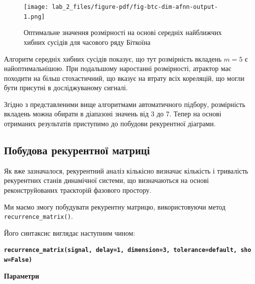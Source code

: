 \documentclass[
  letterpaper,
]{report}
\begin{document}
\begin{figure}[H]

{\centering \texttt{[image: lab\_2\_files/figure-pdf/fig-btc-dim-afnn-output-1.png]}

}

\caption{\label{fig-btc-dim-afnn}Оптимальне значення розмірності на
основі середніх найближчих хибних сусідів для часового ряду Біткоїна}

\end{figure}

Алгоритм середніх хибних сусідів показує, що тут розмірність вкладень
\(m=5\) є найоптимальнішою. При подальшому наростанні розмірності,
атрактор має походити на більш стохастичний, що вказує на втрату всіх
кореляцій, що могли бути присутні в досліджуваному сигналі.

Згідно з представленими вище алгоритмами автоматичного підбору,
розмірність вкладень можна обирати в діапазоні значень від 3 до 7. Тепер
на основі отриманих результатів приступимо до побудови рекурентної
діаграми.

\hypertarget{ux43fux43eux431ux443ux434ux43eux432ux430-ux440ux435ux43aux443ux440ux435ux43dux442ux43dux43eux457-ux43cux430ux442ux440ux438ux446ux456}{%
\subsection{Побудова рекурентної
матриці}\label{ux43fux43eux431ux443ux434ux43eux432ux430-ux440ux435ux43aux443ux440ux435ux43dux442ux43dux43eux457-ux43cux430ux442ux440ux438ux446ux456}}

Як вже зазначалося, рекурентний аналіз кількісно визначає кількість і
тривалість рекурентних станів динамічної системи, що визначаються на
основі реконструйованих траєкторій фазового простору.

Ми маємо змогу побудувати рекурентну матрицю, використовуючи метод
\texttt{recurrence\_matrix()}.

Його синтаксис виглядає наступним чином:

\textbf{\texttt{recurrence\_matrix(signal,\ delay=1,\ dimension=3,\ tolerance=\textquotesingle{}default\textquotesingle{},\ show=False)}}

\textbf{Параметри}
\end{document}
